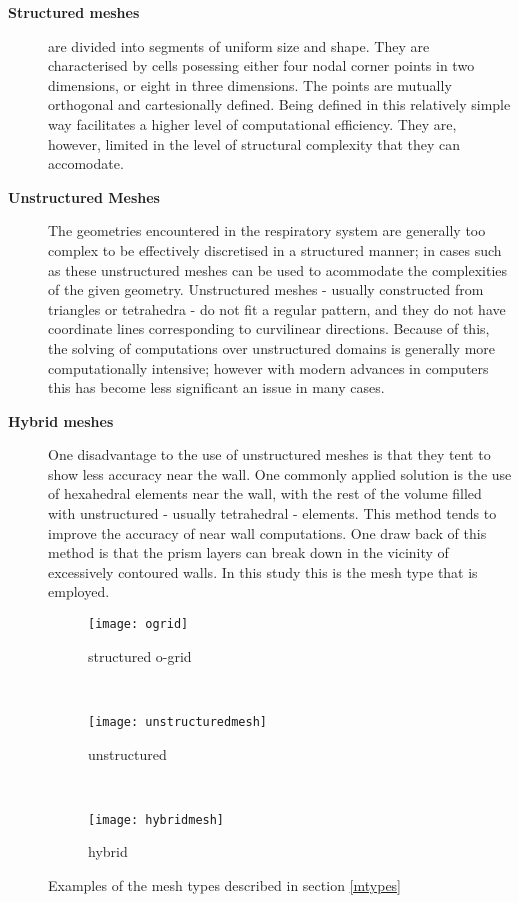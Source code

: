 \begin{description}
  \item[\textbf{Structured meshes}]
    are divided into segments of uniform size and shape. They are characterised by cells posessing either four nodal corner points in two dimensions, or eight in three dimensions. The points are mutually orthogonal and cartesionally defined. Being defined in this relatively simple way facilitates a higher level of computational efficiency. They are, however, limited in the level of structural complexity that they can accomodate.

  \item[\textbf{Unstructured Meshes}] 
    The geometries encountered in the respiratory system are generally too complex to be effectively discretised in a structured manner; in cases such as these unstructured meshes can be used to acommodate the complexities of the given geometry. Unstructured meshes - usually constructed from triangles or tetrahedra - do not fit a regular pattern, and they do not have coordinate lines corresponding to curvilinear directions. Because of this, the solving of computations over unstructured domains is generally more computationally intensive; however with modern advances in computers this has become less significant an issue in many cases.

  \item[\textbf{Hybrid meshes}] 
    One disadvantage to the use of unstructured meshes is that they tent to show less accuracy near the wall. One commonly applied solution is the use of hexahedral elements near the wall, with the rest of the volume filled with unstructured - usually tetrahedral - elements. This method tends to improve the accuracy of near wall computations. One draw back of this method is that the prism layers can break down in the vicinity of excessively contoured walls. In this study this is the mesh type that is employed.

\end{description}

\begin{figure}
  \begin{subfigure}[t]{0.3\textwidth}
    \texttt{[image: ogrid]}
      \caption{structured o-grid}
    \label{strucmesh}
  \end{subfigure}%
  ~%
  \begin{subfigure}[t]{0.3\textwidth}
    \texttt{[image: unstructuredmesh]}
    \caption{unstructured}
    \label{unstrucmesh}
  \end{subfigure}%
  ~%
  \begin{subfigure}[t]{0.3\textwidth}
    \texttt{[image: hybridmesh]}
    \caption{hybrid}
    \label{unstrucmesh}
  \end{subfigure}

  \caption{Examples of the mesh types described in section \ref{mtypes}} 
  \label{fig:struct}
\end{figure}

